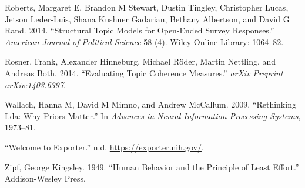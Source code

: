 \documentclass[conference,final,]{IEEEtran}
\begin{document}
\leavevmode\hypertarget{ref-roberts2014structural}{}%
Roberts, Margaret E, Brandon M Stewart, Dustin Tingley, Christopher
Lucas, Jetson Leder-Luis, Shana Kushner Gadarian, Bethany Albertson, and
David G Rand. 2014. ``Structural Topic Models for Open-Ended Survey
Responses.'' \emph{American Journal of Political Science} 58 (4). Wiley
Online Library: 1064--82.

\leavevmode\hypertarget{ref-rosner2014evaluating}{}%
Rosner, Frank, Alexander Hinneburg, Michael Röder, Martin Nettling, and
Andreas Both. 2014. ``Evaluating Topic Coherence Measures.'' \emph{arXiv
Preprint arXiv:1403.6397}.

\leavevmode\hypertarget{ref-wallach2009rethinking}{}%
Wallach, Hanna M, David M Mimno, and Andrew McCallum. 2009. ``Rethinking
Lda: Why Priors Matter.'' In \emph{Advances in Neural Information
Processing Systems}, 1973--81.

\leavevmode\hypertarget{ref-nih}{}%
``Welcome to Exporter.'' n.d. \url{https://exporter.nih.gov/}.

\leavevmode\hypertarget{ref-zipf1949human}{}%
Zipf, George Kingsley. 1949. ``Human Behavior and the Principle of Least
Effort.'' Addison-Wesley Press.
\end{document}
